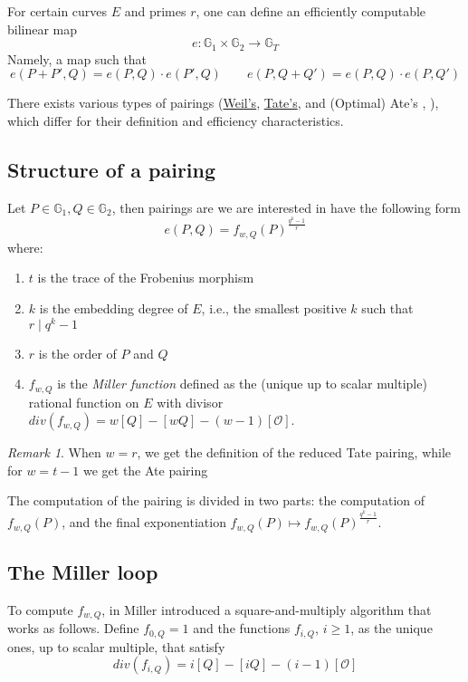 \documentclass{article}
\newcommand{\gOne}{\mathbb{G}_1}
\newcommand{\gTwo}{\mathbb{G}_2}
\newcommand{\ee}{e \colon \mathbb{G}_1 \times \mathbb{G}_2 \rightarrow \mathbb{G}_T}
\newcommand{\cO}{\mathcal{O}}
\theoremstyle{remark}
\newtheorem{remark}{Remark}[section]
\theoremstyle{plain}
\begin{document}
For certain curves $E$ and primes $r$, one can define an efficiently computable bilinear map
\[
\ee
\]
Namely, a map such that
\[
    e(P + P', Q) = e(P,Q) \cdot e(P',Q) \quad \quad e(P, Q + Q') = e(P, Q) \cdot e(P, Q')
\]

There exists various types of pairings (\href{https://en.wikipedia.org/wiki/Weil_pairing}{Weil's}, \href{https://en.wikipedia.org/wiki/Tate_pairing}{Tate's}, and (Optimal) Ate's \cite{HSV-Eta-pairing-revisited}, \cite{V-optimal-ate-pairings}), which differ for their definition and efficiency characteristics.

\subsection{Structure of a pairing}

Let $P \in \gOne, Q \in \gTwo$, then pairings are we are interested in have the following form
\[
e(P,Q) = f_{w,Q}(P)^{\frac{q^k-1}{r}}
\]
where:
\begin{enumerate}
    \item $t$ is the trace of the Frobenius morphism
    \item $k$ is the embedding degree of $E$, i.e., the smallest positive $k$ such that $r \mid q^k - 1$
    \item $r$ is the order of $P$ and $Q$
    \item $f_{w,Q}$ is the \emph{Miller function} defined as the (unique up to scalar multiple) rational function on $E$ with divisor $div(f_{w,Q}) = w [Q] - [wQ] - (w-1)[\cO]$.
\end{enumerate}

\begin{remark}
    When $w = r$, we get the definition of the reduced Tate pairing, while for $w = t-1$ we get the Ate pairing \cite[Thm. 1]{HSV-Eta-pairing-revisited}
\end{remark}

The computation of the pairing is divided in two parts: the computation of $f_{w,Q}(P)$, and the final exponentiation $f_{w,Q}(P) \mapsto f_{w,Q}(P)^{\frac{q^k-1}{r}}$.

\subsection{The Miller loop}

To compute $f_{w,Q}$, in \cite{M-Weil-pairing} Miller introduced a square-and-multiply algorithm that works as follows.
Define $f_{0,Q} = 1$ and the functions $f_{i,Q}$, $i \geq 1$, as the unique ones, up to scalar multiple, that satisfy
\[
div(f_{i,Q}) = i [Q] - [iQ] - (i-1)[\cO]
\]
\end{document}
